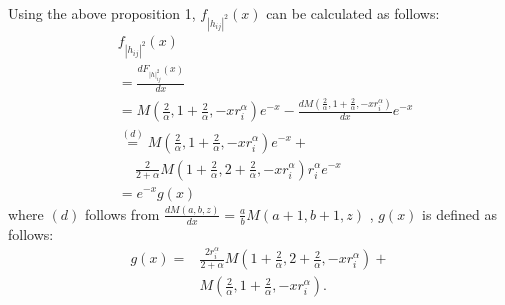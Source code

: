 \documentclass[journal]{IEEEtran}
\begin{document}
\begin{IEEEkeywords}
Using the above proposition 1, $f_{\left|h_{ij} \right|^2} \left(x\right)$ can be calculated as follows:
\begin{align}
&f_{\left|h_{ij} \right|^2} \left(x\right)\nonumber \\ &= \frac{d F_{\left|h\right|_{ij}^2}\left(x\right)}{d x} \nonumber \\
&=M\left(\frac{2}{\alpha}, 1 + \frac{2}{\alpha}, -xr_i^{\alpha}\right)e^{-x} -\frac{d M\left(\frac{2}{\alpha}, 1 + \frac{2}{\alpha}, -x r_i^{\alpha}\right)}{d x} e^{-x} \nonumber \\
&\overset{\left(d\right)}{=} M\left(\frac{2}{\alpha}, 1 + \frac{2}{\alpha}, -xr_i^{\alpha}\right)e^{-x} + \nonumber \\ & \quad \ \frac{2}{2+\alpha}M\left(1 + \frac{2}{\alpha}, 2+\frac{2}{\alpha}, -xr_i^{\alpha}\right)r_i^{\alpha}e^{-x} \nonumber \\
& = e^{-x}g\left(x\right)
\end{align}
where $\left(d\right)$ follows from $\frac{d M\left(a, b, z\right)}{d x} = \frac{a}{b}M\left(a+1, b+1, z\right)$ \cite[13.4.8]{MAbramowitz}, $g\left(x\right)$ is defined as follows:
\begin{align}
g\left(x\right) =& \frac{2r_i^{\alpha}}{2+\alpha} M\left(1 + \frac{2}{\alpha}, 2+ \frac{2}{\alpha}, -xr_i^{\alpha}\right) + \nonumber \\ & M\left(\frac{2}{\alpha}, 1 + \frac{2}{\alpha}, -xr_i^{\alpha}\right).
\end{align}


\end{IEEEkeywords}
\end{document}

